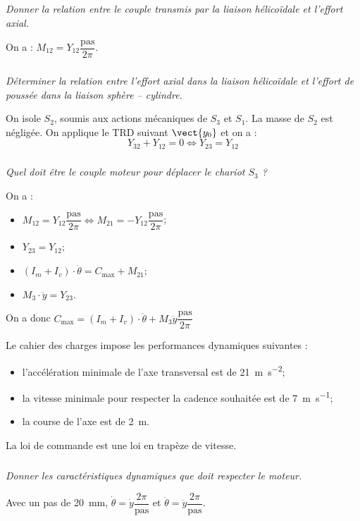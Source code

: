 \begin{multicols}{2}
\subparagraph{}
\textit{Donner la relation entre le couple transmis par la liaison hélicoïdale et l'effort axial.}
\ifprof
\begin{corrige}
On a : $M_{12}=Y_{12}\dfrac{\text{pas}}{2\pi}$.
\end{corrige}
\else
\fi
\subparagraph{}
\textit{Déterminer la relation entre l'effort axial dans la liaison hélicoïdale et l'effort de poussée dans la liaison sphère -- cylindre.}
\ifprof
\begin{corrige}
On isole $S_2$, soumis aux actions mécaniques de $S_3$ et $S_1$. La masse de $S_2$ est négligée. 
On applique le TRD suivant $\vect{y_0}$ et on a : 
$$
Y_{32}+Y_{12}=0 \Leftrightarrow 
Y_{23}=Y_{12}
$$
\end{corrige}
\else
\fi


\subparagraph{}
\textit{Quel doit être le couple moteur pour déplacer le chariot $S_3$ ?}
\ifprof
\begin{corrige}
On a : 
\begin{itemize}
\item $M_{12}=Y_{12}\dfrac{\text{pas}}{2\pi} \Leftrightarrow M_{21}=-Y_{12}\dfrac{\text{pas}}{2\pi}$;
\item $Y_{23}=Y_{12}$;
\item $(I_m+I_v)\cdot \ddot{\theta}=C_{\text{max}}+M_{21}$;
\item $M_3\cdot \ddot{y}=Y_{23}$.
\end{itemize}

On a donc $C_{\text{max}}=(I_m+I_v)\cdot \ddot{\theta}+M_3 \ddot{y}\dfrac{\text{pas}}{2\pi}$
\end{corrige}
\else
\fi

Le cahier des charges impose les performances dynamiques suivantes : 
\begin{itemize}
\item l'accélération minimale de l'axe transversal est de \SI{21}{m.s^{-2}};
\item la vitesse minimale pour respecter la cadence souhaitée est de \SI{7}{m.s^{-1}};
\item la course de l'axe est de \SI{2}{m}.
\end{itemize}

La loi de commande est une loi en trapèze de vitesse. 
\subparagraph{}
\textit{Donner les caractéristiques dynamiques que doit respecter le moteur.}
\ifprof
\begin{corrige}
Avec un pas de \SI{20}{mm}, $\dot{\theta}=\dot{y}\dfrac{2\pi}{\text{pas}}$ et $\ddot{\theta}=\ddot{y}\dfrac{2\pi}{\text{pas}}$. 


\end{corrige}
\end{multicols}

